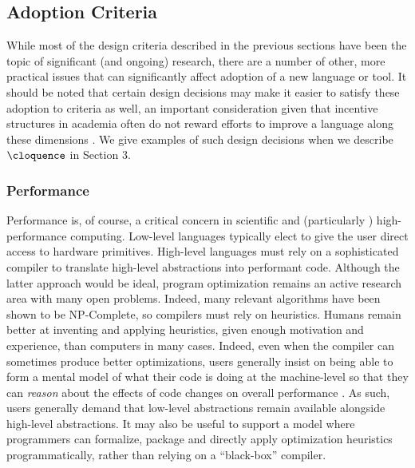 \subsection{Adoption Criteria}
While most of the design criteria described in the previous sections have been the topic of significant (and ongoing) research, there are a number of other, more practical issues that can significantly affect adoption of a new language or tool. It should be noted that certain design decisions may make it easier to satisfy these adoption to criteria as well, an important consideration given that incentive structures in academia often do not reward efforts to improve a language along these dimensions \cite{howison2011scientific}. We give examples of such design decisions when we describe $\cloquence$ in Section 3.

\subsubsection{Performance}
Performance is, of course, a critical concern in scientific and (particularly \cite{basili2008understanding}) high-performance computing. Low-level languages typically elect to give the user direct access to hardware primitives. High-level languages must rely on a sophisticated compiler to translate high-level abstractions into performant code. Although the latter approach would be ideal, program optimization remains an active research area with many open problems. Indeed, many relevant algorithms have been shown to be NP-Complete, so compilers must rely on heuristics. Humans remain better at inventing and applying heuristics, given enough motivation and experience, than computers in many cases. Indeed, even when the compiler can sometimes produce better optimizations, users generally insist on being able to form a mental model of what their code is doing at the machine-level so that they can {\it reason} about the effects of code changes on overall performance \cite{squires2005programmers}. As such, users generally demand that low-level abstractions remain available alongside high-level abstractions. It may also be useful to support a model where programmers can formalize, package and directly apply optimization heuristics programmatically, rather than relying on a ``black-box'' compiler.


